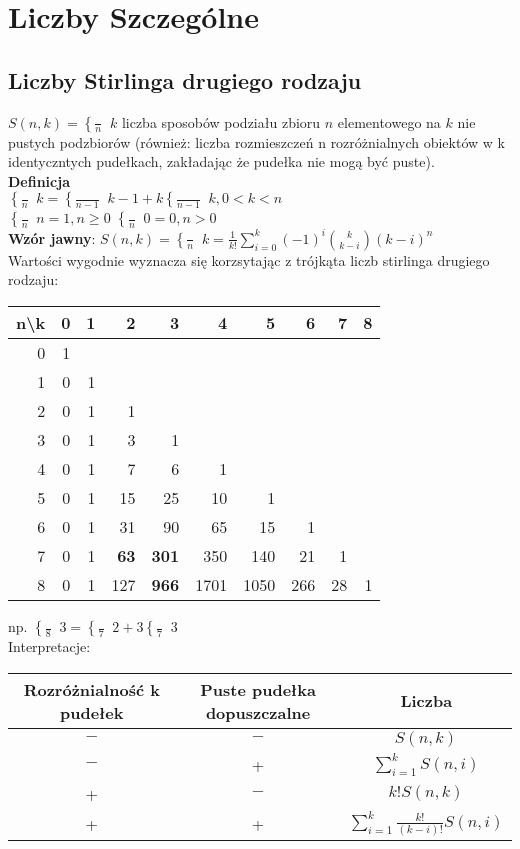 \documentclass[a4paper,12pt]{article}
\DeclareRobustCommand{\Stirling}{\genfrac \{ \} {0pt}{}} %
\begin{document}
\section{Liczby Szczególne}
\subsection{Liczby Stirlinga drugiego rodzaju}
$S(n,k)=\Stirling{n}{k}$ liczba sposobów podziału zbioru $n$ elementowego na $k$ nie pustych podzbiorów (również: liczba rozmieszczeń n rozróżnialnych obiektów w k identyczntych pudełkach, zakładając że pudełka nie mogą być puste).\\
\textbf{Definicja}\\
$\Stirling{n}{k}=\Stirling{n-1}{k-1}+k\Stirling{n-1}{k}, 0<k<n$ \\
$\Stirling{n}{n}=1, n\geq0$ $\Stirling{n}{0}=0, n>0$ \\
\textbf{Wzór jawny}: $S(n,k)=\Stirling{n}{k}=\frac{1}{k!}\sum_{i=0}^k(-1)^i{{k}\choose{k-i}}(k-i)^n$ \\
Wartości wygodnie wyznacza się korzsytając z trójkąta liczb stirlinga drugiego rodzaju:\\
\begin{tabular}{|r|r|r|r|r|r|r|r|r|r|} 
 \hline
 n\textbackslash k & 0 & 1 & 2 & 3 & 4 & 5 & 6 & 7 & 8\\ \hline
 0&1&&&&&&&& \\ \hline
 1&0&1&&&&&&&\\ \hline
 2&0&1&1&&&&&&\\ \hline
 3&0&1&3&1&&&&&\\ \hline
 4&0&1&7&6&1&&&&\\ \hline
 5&0&1&15&25&10&1&&&\\ \hline
 6&0&1&31&90&65&15&1&&\\ \hline
 7&0&1&\textbf{63}&\textbf{301}&350&140&21&1&\\ \hline
 8&0&1&127&\textbf{966}&1701&1050&266&28&1\\ \hline
\end{tabular}
np. $\Stirling{8}{3}=\Stirling{7}{2}+3\Stirling{7}{3}$\\
Interpretacje:\\
\begin{tabular}{c|c|c}
 Rozróżnialność k pudełek & Puste pudełka dopuszczalne & Liczba\\ \hline
 $-$ & $-$ & $S(n,k)$ \\
 $-$ & + & $\sum_{i=1}^k S(n,i)$ \\
 + & $-$ & $k! S(n,k)$ \\
 + & + & $\sum_{i=1}^k\frac{k!}{(k-i)!}S(n,i)$\\
\end{tabular}
\end{document}
